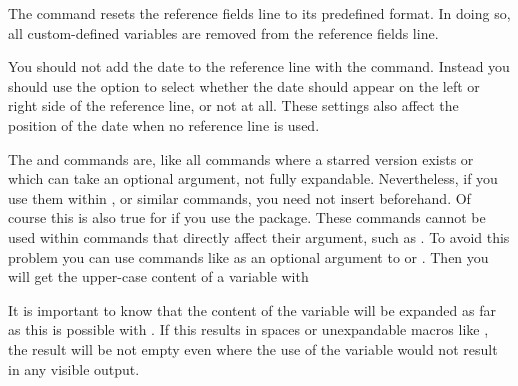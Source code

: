 The  command resets the reference fields line to its
predefined format. In doing so, all custom-defined variables are removed from
the reference fields line.

You should not add the date to the reference line with
the  command. Instead you should use the
%
%
%
%
 option to select whether the date
should appear on the left or right side of the reference line, or not at all.
These settings also affect the position of the date when no reference line is
used.%
%
\EndIndexGroup


\begin{Declaration}
\end{Declaration}
The  and 
commands are, like all commands where a starred version exists or which can
take an optional argument, not fully expandable. Nevertheless, if you use them
within ,
 or similar commands, you
need not insert  beforehand. Of course
this is also true for
 if you use the
\hyperref[cha:scrlayer-scrpage]{}%
 package. These commands
cannot be used within commands that directly affect their argument, such as
%
. To avoid this problem you can use commands like
 as an optional argument to  or
. Then you will get the upper-case content of a variable
with
\begin{lstcode}[escapeinside=`']
\end{lstcode}
%
\EndIndexGroup


\begin{Declaration}
\end{Declaration}
It is important to know that the content of the variable will be expanded as
far as this is possible with . If this results in spaces or
unexpandable macros like , the result will be not empty even
where the use of the variable would not result in any visible output.


